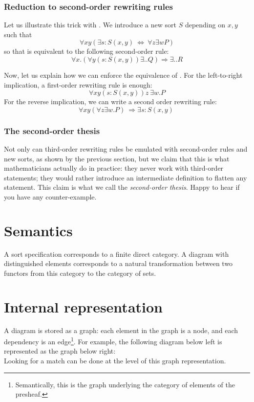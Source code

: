 \documentclass{article}
\begin{document}
\subsubsection{Reduction to second-order rewriting rules}

Let us illustrate this trick with .
We introduce a new sort $S$ depending on $x,y$ such that
\begin{equation}
    \label{eq:sort-equivalence}
∀ xy\left(∃ s:S(x,y)\   ⇔ \ 
∀ z ∃ w P\right) 
\end{equation}
so that  is equivalent to the following second-order rule:
\[
    ∀ x. \left(∀y(s:S(x,y)) ∃..Q  \right) ⇒ ∃.. R
\]


Now, let us explain how we can enforce the equivalence of
.
For the left-to-right implication, a first-order rewriting rule is enough:
\[
    ∀ xy (s:S(x,y))z   \ 
    ∃ w. P
\]
For the reverse implication, we can write a second order rewriting rule:
\[
    ∀xy(∀ z ∃ w. P)\   ⇒ ∃s:S(x,y)  \
\]

\subsubsection{The second-order thesis}
Not only can third-order rewriting rules be emulated with second-order rules and new sorts, as shown by the previous section, but we claim that this is what mathematicians actually do in practice: they never work with third-order statements; they would rather introduce an intermediate definition to flatten any statement.
This claim is what we call the \emph{second-order thesis}. Happy to hear if you have any counter-example.


\section{Semantics}
A sort specification corresponds to a finite direct category. 
A diagram with distinguished elements corresponds to a 
natural transformation between two functors from this category to the category of sets.
\section{Internal representation}
A diagram is stored as a graph: 
each element in the graph is a node, and each dependency is an edge\footnote{Semantically, this is the graph underlying the category of elements of the presheaf.}.
For example, the following diagram below left is represented as the graph below right:
\[

\]
Looking for a match can be done at the level of this graph representation.
\appendix
\end{document}
